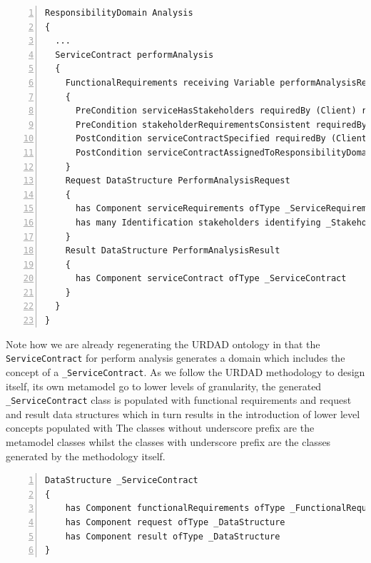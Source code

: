 \lstset{language=urdad,caption=Specifying a state constraint in the URDAD text grammar.,label=contractTextSyntax}
\begin{lstlisting}[numbers=left,escapechar=|]
ResponsibilityDomain Analysis
{
  ...
  ServiceContract performAnalysis 
  {
    FunctionalRequirements receiving Variable performAnalysisRequest ofType PerformAnalysisRequest yielding Variable performAnalsysiResult ofType PerformAnalysisResult
    {
      PreCondition serviceHasStakeholders requiredBy (Client) raises NoStakeholdersException checks Constraint ServiceHasStakeholders with Query OCL:"performAnalaysisRequest.serviceRequirements"
      PreCondition stakeholderRequirementsConsistent requiredBy (Client Development Architecture Testing) raises InconsistentStakeholderRequirementsException checks Constraint StakeholderRequirementsConsistent with Query OCL:"performAnalysisResult.serviceContract"
      PostCondition serviceContractSpecified requiredBy (Client Development Architecture Testing) ensures Constraint ServiceContractSpecified with Query OCL:"performAnalysisResult"
      PostCondition serviceContractAssignedToResponsibilityDomain requiredBy (Client) ensures Constraint ServiceContractAssignedToResponsibilityDomain with Query OCL:"performAnalysisResult.serviceContract"
    }
    Request DataStructure PerformAnalysisRequest
    {
      has Component serviceRequirements ofType _ServiceRequirements
      has many Identification stakeholders identifying _Stakeholder
    }
    Result DataStructure PerformAnalysisResult
    {
      has Component serviceContract ofType _ServiceContract
    }
  }
}
\end{lstlisting}

Note how we are already regenerating the URDAD ontology in that the \verb+ServiceContract+ for perform analysis generates a domain which includes the concept of a \verb+_ServiceContract+. As we follow the URDAD methodology to design itself, its own metamodel go to lower levels of granularity, the generated \verb+_ServiceContract+ class is populated with functional requirements and request and result data structures which in turn results in the introduction of lower level concepts populated with  The classes without underscore prefix are the metamodel classes whilst the classes with underscore prefix are the classes generated by the methodology itself. 

\lstset{language=urdad,caption=Regenerated metamodel classes.,label=constraintTextSyntax}
\begin{lstlisting}[numbers=left,escapechar=|]
DataStructure _ServiceContract 
{
    has Component functionalRequirements ofType _FunctionalRequirements
    has Component request ofType _DataStructure
    has Component result ofType _DataStructure
}
\end{lstlisting}

